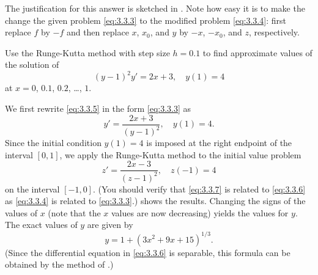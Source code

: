 The justification for this answer is sketched in
. Note how easy it is to make the change
the given problem \eqref{eq:3.3.3} to the modified problem
\eqref{eq:3.3.4}: first replace $f$ by $-f$ and then replace $x$,
$x_0$, and $y$ by $-x$, $-x_0$, and $z$, respectively.


\begin{example}\label{example:3.3.5}
Use the Runge-Kutta  method with step size $h=0.1$
 to find approximate values of the solution of
\begin{equation} \label{eq:3.3.5}
(y-1)^2y'=2x+3,\quad y(1)=4
\end{equation}
at $x=0$, $0.1$, $0.2$, \dots, $1$.
\end{example}

\begin{solution}
We first rewrite \eqref{eq:3.3.5} in the form \eqref{eq:3.3.3}
as
\begin{equation} \label{eq:3.3.6}
y'=\frac{2x+3}{(y-1)^2},\quad y(1)=4.
\end{equation}
Since the initial condition $y(1)=4$  is imposed at the right endpoint
of the interval $[0,1]$, we apply the Runge-Kutta method to the
initial value problem
\begin{equation} \label{eq:3.3.7}
z'=\frac{2x-3}{(z-1)^2},\quad z(-1)=4
\end{equation}
on the interval $[-1,0]$.
(You should verify that \eqref{eq:3.3.7} is related to \eqref{eq:3.3.6} as
\eqref{eq:3.3.4} is related to \eqref{eq:3.3.3}.)
 shows the results.
Changing the signs of the values of $x$
(note that the $x$ values are now decreasing)
yields the values for $y$.   The
exact values of $y$
are given by
\[
y=1+(3x^2+9x+15)^{1/3}.
\]
(Since the differential equation in \eqref{eq:3.3.6} is separable,
this formula can be obtained by the method of .)
\end{solution}


